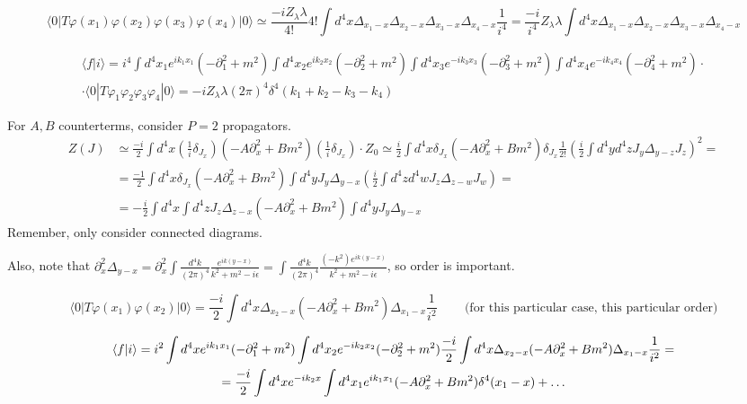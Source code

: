 \documentclass[twoside]{amsart}
\begin{document}
\begin{itemize}
\[
\langle 0 | T \varphi(x_1) \varphi(x_2) \varphi(x_3) \varphi(x_4) | 0 \rangle \simeq \frac{ - i Z_{\lambda} \lambda }{4!} 4! \int d^4x \Delta_{x_1 -x} \Delta_{x_2 -x} \Delta_{x_3 -x} \Delta_{x_4 -x} \frac{1}{i^4} = \frac{-i}{i^4 } Z_{\lambda} \lambda \int d^4x \Delta_{x_1 -x} \Delta_{x_2 -x} \Delta_{x_3 -x } \Delta_{x_4 -x}
\]

\[
\begin{gathered}
  \langle f | i \rangle = i^4 \int d^4x_1 e^{ i k_1 x_1} ( - \partial_1^2 + m^2 ) \int d^4x_2 e^{ i k_2 x_2} ( - \partial_2^2 + m^2 ) \int d^4x_3 e^{-i k_3 x_3} ( -\partial_3^2 + m^2 ) \int d^4x_4 e^{-ik_4 x_4} ( - \partial_4^2 + m^2 ) \cdot \\
  \cdot \langle 0 | T \varphi_1 \varphi_2 \varphi_3 \varphi_4 | 0 \rangle  = - i Z_{\lambda} \lambda (2\pi)^4 \delta^4(k_1 + k_2 - k_3 - k_4) 
\end{gathered}
\]

For $A,B$ counterterms, consider $P=2$ propagators.  
\[
\begin{aligned}
  Z(J) &  \simeq \frac{-i}{2} \int d^4x \left( \frac{1}{i} \delta_{J_x} \right) ( - A \partial_x^2 +  Bm^2 ) \left( \frac{1}{i} \delta_{J_x} \right) \cdot Z_0  \simeq \frac{i}{2} \int d^4x \delta_{J_x} ( - A \partial_x^2 + B m^2 ) \delta_{J_x} \frac{1}{2!} \left( \frac{i}{2} \int d^4y d^4z J_y \Delta_{y-z} J_z \right)^2 = \\
  & = \frac{-1}{2} \int d^4x \delta_{J_x} ( - A \partial_x^2 + Bm^2 ) \int d^4y J_y \Delta_{y-x} \left( \frac{i}{2} \int d^4z d^4w J_z \Delta_{z-w} J_w \right) = \\ 
  & = - \frac{i}{2} \int d^4x \int d^4z J_z \Delta_{z-x} ( - A \partial_x^2 + Bm^2) \int d^4y J_y \Delta_{y-x}
\end{aligned}
\]
Remember, only consider connected diagrams.  

Also, note that $ \partial_x^2 \Delta_{y-x} = \partial_x^2 \int \frac{d^4k}{(2\pi)^4} \frac{ e^{ ik (y-x)} }{ k^2 + m^2 - i \epsilon } = \int \frac{ d^4k}{(2\pi)^4} \frac{ ( -k^2) e^{ik(y-x)}}{ k^2 + m^2 - i \epsilon }$, so order is important.  

\[
\langle 0 | T \varphi(x_1) \varphi(x_2) | 0 \rangle = \frac{-i}{2} \int d^4x \Delta_{x_2 - x} ( - A \partial_x^2 + Bm^2) \Delta_{x_1- x} \frac{1}{i^2} \quad \quad \, \text{(for this particular case, this particular order)}
\]

\begin{gather}
  \langle f | i \rangle = i^2 \int d^4x e^{ik_1 x_1} ( - \partial_1^2 + m^2) \int d^4x_2 e^{-ik_2x_2} ( - \partial_2^2 + m^2) \frac{- i }{2}\int d^4x \Delta_{x_2 - x} (  - A \partial_x^2 + Bm^2 ) \Delta_{x_1 - x} \frac{1}{i^2} = \\ \notag 
  = \frac{-i }{2} \int d^4x e^{-ik_2 x} \int d^4x_1 e^{ik_1 x_1 } ( - A \partial_x^2 + Bm^2) \delta^4(x_1 - x) + \dots \label{Eq:phi4_counter}
\end{gather}



\end{itemize}
\end{document}
